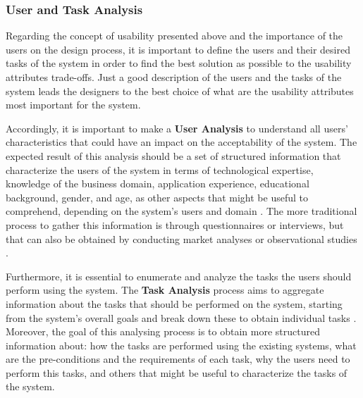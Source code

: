 
\subsubsection{User and Task Analysis}
\label{subsubsec:user_and_task_analysis}
Regarding the concept of usability presented above and the importance of the users on the design process, it is important to define the users and their desired tasks of the system in order to find the best solution as possible to the usability attributes trade-offs. Just a good description of the users and the tasks of the system leads the designers to the best choice of what are the usability attributes most important for the system.

Accordingly, it is important to make a \textbf{User Analysis} to understand all users’ characteristics that could have an impact on the acceptability of the system. The expected result of this analysis should be a set of structured information that characterize the users of the system in terms of technological expertise, knowledge of the business domain, application experience, educational background, gender, and age, as other aspects that might be useful to comprehend, depending on the system’s users and domain \cite{userAnalysisInHCI_theHistoricalLessonFromIndividualDifferencesResearch}. The more traditional process to gather this information is through questionnaires or interviews, but that can also be obtained by conducting market analyses or observational studies \cite{usabilityEngineering}.

Furthermore, it is essential to enumerate and analyze the tasks the users should perform using the system. The \textbf{Task Analysis} process aims to aggregate information about the tasks that should be performed on the system, starting from the system's overall goals and break down these to obtain individual tasks \cite{usabilityEngineering}. Moreover, the goal of this analysing process is to obtain more structured information about: how the tasks are performed using the existing systems, what are the pre-conditions and the requirements of each task, why the users need to perform this tasks, and others that might be useful to characterize the tasks of the system. 

